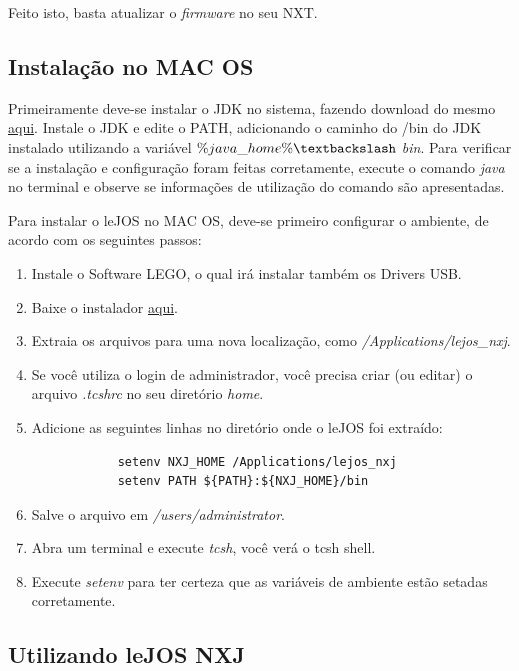	Feito isto, basta atualizar o \textit{firmware} no seu NXT.

\subsection{Instalação no MAC OS} %
\label{sub:instalação_no_mac_os}
	
	Primeiramente deve-se instalar o JDK no sistema, fazendo download do mesmo \href{http://www.oracle.com/technetwork/java/}{aqui}. Instale o JDK e edite o PATH, adicionando o caminho do /bin do JDK instalado utilizando a variável \textit{$\%java\_home\% \textbackslash$ bin}. Para verificar se a instalação e configuração foram feitas corretamente, execute o comando \textit{java} no terminal e observe se informações de utilização do comando são apresentadas.

	Para instalar o leJOS no MAC OS, deve-se primeiro configurar o ambiente, de acordo com os seguintes passos:

	\begin{enumerate}
		\item Instale o Software LEGO, o qual irá instalar também os Drivers USB.
		\item Baixe o instalador \href{www.lejos.org}{aqui}.
		\item Extraia os arquivos para uma nova localização, como \textit{/Applications/lejos\_nxj}.
		\item Se você utiliza o login de administrador, você precisa criar (ou editar) o arquivo \textit{.tcshrc} no seu diretório \textit{home}.
		\item Adicione as seguintes linhas no diretório onde o leJOS foi extraído:
		\begin{lstlisting}
			setenv NXJ_HOME /Applications/lejos_nxj
			setenv PATH ${PATH}:${NXJ_HOME}/bin
		\end{lstlisting}
		\item Salve o arquivo em \textit{/users/administrator}.
		\item Abra um terminal e execute \textit{tcsh}, você verá o tcsh shell.
		\item Execute \textit{setenv} para ter certeza que as variáveis de ambiente estão setadas corretamente.
	\end{enumerate}

\subsection{Utilizando leJOS NXJ} %
\label{sub:utilizando_lejos_nxj}
	
